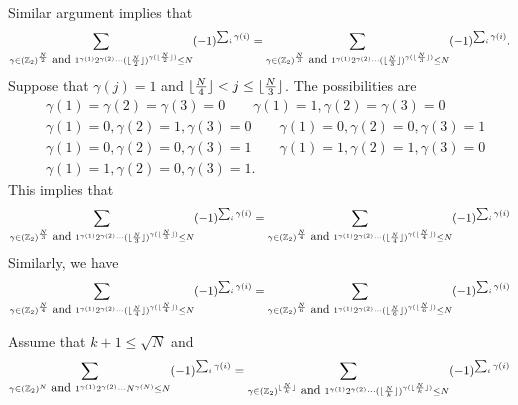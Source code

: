 \documentclass[a4paper,10pt]{amsart}
\newcommand{\Z}{\mathbb Z} %
\DeclarePairedDelimiter\floor{\lfloor}{\rfloor}
\begin{document}
Similar argument implies that
\begin{align*}
    \sum_{\gamma \in (\Z_{2})^{\frac{N}{2}} \mbox{ and } 
    1^{\gamma(1)}2^{\gamma(2)}\cdots 
(\floor{\frac{N}{2}})^{\gamma(\floor{\frac{N}{2}})} \leq N} 
    (-1)^{\sum_{i}\gamma(i)}
=\sum_{\gamma \in (\Z_{2})^{\frac{N}{3}} \mbox{ and } 
    1^{\gamma(1)}2^{\gamma(2)}\cdots 
(\floor{\frac{N}{3}})^{\gamma(\floor{\frac{N}{3}})} \leq N} 
    (-1)^{\sum_{i}\gamma(i)}.
\end{align*}
Suppose that $\gamma(j) = 1$ and $\floor{\frac{N}{4}} < j \leq 
\floor{\frac{N}{3}}$.
The possibilities are
\begin{align*}
    &\gamma(1) = \gamma(2) = \gamma(3) = 0 \qquad 
    \gamma(1) = 1, \gamma(2) = \gamma(3) = 0 \\
    &\gamma(1) = 0, \gamma(2) = 1, \gamma(3) = 0 \qquad 
    \gamma(1) = 0, \gamma(2) = 0, \gamma(3) = 1 \\
    &\gamma(1) = 0, \gamma(2) = 0, \gamma(3) = 1 \qquad 
    \gamma(1) = 1, \gamma(2) = 1, \gamma(3) = 0 \\
    &\gamma(1) = 1, \gamma(2) = 0, \gamma(3) = 1.
\end{align*}
This implies that
\begin{align*}
    \sum_{\gamma \in (\Z_{2})^{\frac{N}{3}} \mbox{ and } 
    1^{\gamma(1)}2^{\gamma(2)}\cdots 
(\floor{\frac{N}{3}})^{\gamma(\floor{\frac{N}{3}})} \leq N} 
    (-1)^{\sum_{i}\gamma(i)}
=\sum_{\gamma \in (\Z_{2})^{\frac{N}{4}} \mbox{ and } 
    1^{\gamma(1)}2^{\gamma(2)}\cdots 
(\floor{\frac{N}{4}})^{\gamma(\floor{\frac{N}{4}})} \leq N} 
    (-1)^{\sum_{i}\gamma(i)}
\end{align*}
Similarly, we have
\begin{align*}
    \sum_{\gamma \in (\Z_{2})^{\frac{N}{4}} \mbox{ and } 
    1^{\gamma(1)}2^{\gamma(2)}\cdots 
(\floor{\frac{N}{4}})^{\gamma(\floor{\frac{N}{4}})} \leq N} 
    (-1)^{\sum_{i}\gamma(i)}
    =\sum_{\gamma \in (\Z_{2})^{\frac{N}{6}} \mbox{ and } 
    1^{\gamma(1)}2^{\gamma(2)}\cdots 
(\floor{\frac{N}{6}})^{\gamma(\floor{\frac{N}{6}})} \leq N} 
    (-1)^{\sum_{i}\gamma(i)}
\end{align*}

Assume that $k + 1 \leq \sqrt{N}$ and 
\begin{align*}
    \sum_{\gamma \in (\Z_{2})^{N} \mbox{ and } 
    1^{\gamma(1)}2^{\gamma(2)}\cdots N^{\gamma(N)} \leq N} 
    (-1)^{\sum_{i}\gamma(i)} 
    = \sum_{\gamma \in (\Z_{2})^{\floor{\frac{N}{k}}} \mbox{ and } 
    1^{\gamma(1)}2^{\gamma(2)}\cdots 
    (\floor{\frac{N}{k}})^{\gamma(\floor{\frac{N}{k}})} \leq N} 
    (-1)^{\sum_{i}\gamma(i)}
\end{align*}
\end{document}
